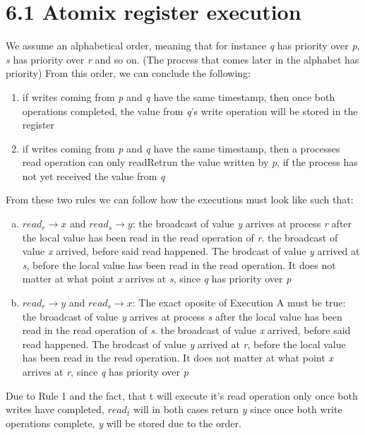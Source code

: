 \documentclass{article}
\begin{document}
	\pagestyle{fancy}
	
    	\section*{6.1 Atomix register execution}
    	We assume an alphabetical order, meaning that for instance \textit{q} has priority over \textit{p}, \textit{s} has priority over \textit{r} and so on. (The process that comes later in the alphabet has priority)
	From this order, we can conclude the following:
	\begin{enumerate}
		\item if writes coming from \textit{p} and \textit{q} have the same timestamp, then once both operations completed, the value from \textit{q}'s write operation will be stored in the register
		\item if writes coming from \textit{p} and \textit{q} have the same timestamp, then a processes read operation can only readRetrun the value written by \textit{p}, if the process has not yet received the value from \textit{q}
	\end{enumerate}
	From these two rules we can follow how the executions must look like such that:
	\begin{enumerate}[a)]
		\item $\textit{read}_r \rightarrow \textit{x}$ and $\textit{read}_s \rightarrow \textit{y}$: the broadcast of value \textit{y} arrives at process \textit{r} after the local value has been read in the read operation of \textit{r}. the broadcast of value \textit{x} arrived, before said read happened. The brodcast of value \textit{y} arrived at \textit{s}, before the local value has been read in the read operation. It does not matter at what point \textit{x} arrives at \textit{s}, since \textit{q} has priority over \textit{p}
		\item $\textit{read}_r \rightarrow \textit{y}$ and $\textit{read}_s \rightarrow \textit{x}$: The exact oposite of Execution A must be true: 
		 the broadcast of value \textit{y} arrives at process \textit{s} after the local value has been read in the read operation of \textit{s}. the broadcast of value \textit{x} arrived, before said read happened. The brodcast of value \textit{y} arrived at  \textit{r}, before the local value has been read in the read operation. It does not matter at what point \textit{x} arrives at \textit{r}, since \textit{q} has priority over \textit{p}
	\end{enumerate}

	Due to Rule 1 and the fact, that t will execute it's read operation only once both writes have completed, $\textit{read}_t$ will in both cases return \textit{y} since once both write operations complete, \textit{y} will be stored due to the order.
\end{document}
